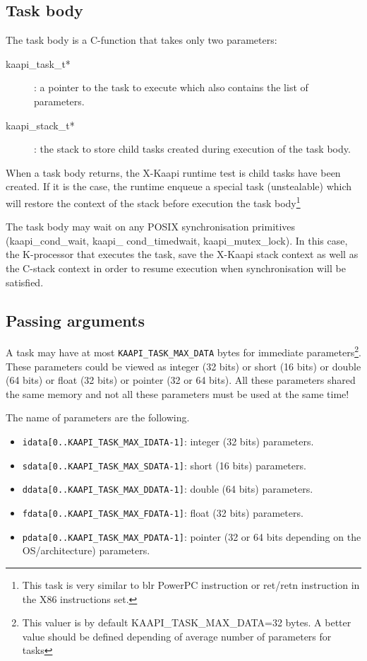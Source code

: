 \documentclass{report}
\newcommand{\kaapi}{\textsc{X}-Kaapi\xspace}
\begin{document}
\subsection{Task body}

The task body is a C-function that takes only two parameters:
\begin{description}
\item [kaapi\_task\_t*]: a pointer to the task to execute which also contains the list of parameters.
\item [kaapi\_stack\_t*]: the stack to store child  tasks created during execution of the task body.
\end{description}

When a task body returns, the \kaapi runtime test is child tasks have been created.
If it is the case, the runtime enqueue a special task (unstealable) which will restore the
context of the stack before execution the task body\footnote{This task is very similar to blr PowerPC instruction or ret/retn instruction in the X86 instructions set.}

The task body may wait on any POSIX synchronisation primitives (kaapi\_cond\_wait, kaapi\_ cond\_timedwait, kaapi\_mutex\_lock). In this case, the K-processor that executes the task, save the \kaapi stack context as well as the C-stack context in order to resume execution when synchronisation will be satisfied.

\subsection{Passing arguments} \label{sec:param}

A task may have at most \verb+KAAPI_TASK_MAX_DATA+ bytes for immediate parameters\footnote{This valuer is by default KAAPI\_TASK\_MAX\_DATA=32 bytes. A better value should be defined depending of average number of parameters for tasks}. These parameters could be viewed as integer (32 bits) or short (16 bits) or double (64 bits) or float (32 bits) or pointer (32 or 64 bits). All these parameters shared the same memory and not all these parameters must be used at the same time!

The name of parameters are the following.
\begin{itemize}
\item \verb+idata[0..KAAPI_TASK_MAX_IDATA-1]+: integer (32 bits) parameters.
\item \verb+sdata[0..KAAPI_TASK_MAX_SDATA-1]+: short (16 bits) parameters.
\item \verb+ddata[0..KAAPI_TASK_MAX_DDATA-1]+: double (64 bits) parameters.
\item \verb+fdata[0..KAAPI_TASK_MAX_FDATA-1]+: float (32 bits) parameters.
\item \verb+pdata[0..KAAPI_TASK_MAX_PDATA-1]+: pointer (32 or 64 bits depending on the OS/architecture) parameters.
\end{itemize}
\end{document}
